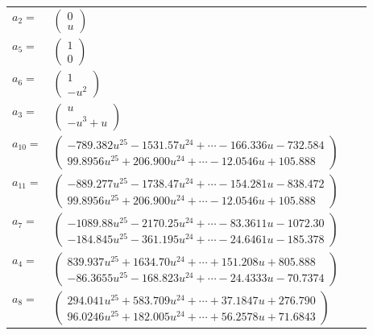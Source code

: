 \documentclass[1p]{elsarticle_modified}
\theoremstyle{definition}
\begin{document}
\begin{tabular}{m{7pt} m{180pt} m{7pt} m{180pt} }
\flushright $a_{2}=$&$\begin{pmatrix}0\\u\end{pmatrix}$ \\
\flushright $a_{5}=$&$\begin{pmatrix}1\\0\end{pmatrix}$ \\
\flushright $a_{6}=$&$\begin{pmatrix}1\\- u^2\end{pmatrix}$ \\
\flushright $a_{3}=$&$\begin{pmatrix}u\\- u^3+u\end{pmatrix}$ \\
\flushright $a_{10}=$&$\begin{pmatrix}-789.382 u^{25}-1531.57 u^{24}+\cdots-166.336 u-732.584\\99.8956 u^{25}+206.900 u^{24}+\cdots-12.0546 u+105.888\end{pmatrix}$ \\
\flushright $a_{11}=$&$\begin{pmatrix}-889.277 u^{25}-1738.47 u^{24}+\cdots-154.281 u-838.472\\99.8956 u^{25}+206.900 u^{24}+\cdots-12.0546 u+105.888\end{pmatrix}$ \\
\flushright $a_{7}=$&$\begin{pmatrix}-1089.88 u^{25}-2170.25 u^{24}+\cdots-83.3611 u-1072.30\\-184.845 u^{25}-361.195 u^{24}+\cdots-24.6461 u-185.378\end{pmatrix}$ \\
\flushright $a_{4}=$&$\begin{pmatrix}839.937 u^{25}+1634.70 u^{24}+\cdots+151.208 u+805.888\\-86.3655 u^{25}-168.823 u^{24}+\cdots-24.4333 u-70.7374\end{pmatrix}$ \\
\flushright $a_{8}=$&$\begin{pmatrix}294.041 u^{25}+583.709 u^{24}+\cdots+37.1847 u+276.790\\96.0246 u^{25}+182.005 u^{24}+\cdots+56.2578 u+71.6843\end{pmatrix}$ \\

\end{tabular}
\end{document}
